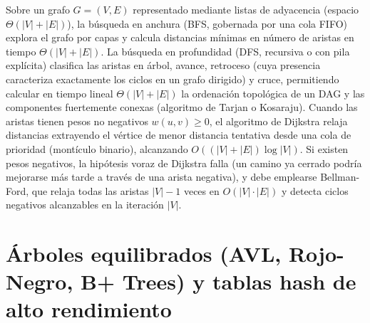 \documentclass{book}
\begin{document}
Sobre un grafo \(G = (V, E)\) representado mediante listas de adyacencia (espacio \(\Theta(|V| + |E|)\)), la búsqueda en anchura (BFS, gobernada por una cola FIFO) explora el grafo por capas y calcula distancias mínimas en número de aristas en tiempo \(\Theta(|V| + |E|)\). La búsqueda en profundidad (DFS, recursiva o con pila explícita) clasifica las aristas en árbol, avance, retroceso (cuya presencia caracteriza exactamente los ciclos en un grafo dirigido) y cruce, permitiendo calcular en tiempo lineal \(\Theta(|V| + |E|)\) la ordenación topológica de un DAG y las componentes fuertemente conexas (algoritmo de Tarjan o Kosaraju).
Cuando las aristas tienen pesos no negativos \(w(u, v) \ge 0\), el algoritmo de Dijkstra relaja distancias extrayendo el vértice de menor distancia tentativa desde una cola de prioridad (montículo binario), alcanzando \(O((|V| + |E|) \log |V|)\). Si existen pesos negativos, la hipótesis voraz de Dijkstra falla (un camino ya cerrado podría mejorarse más tarde a través de una arista negativa), y debe emplearse Bellman-Ford, que relaja todas las aristas \(|V| - 1\) veces en \(O(|V| \cdot |E|)\) y detecta ciclos negativos alcanzables en la iteración \(|V|\).

\section{Árboles equilibrados (AVL, Rojo-Negro, B+ Trees) y tablas hash de alto rendimiento}
\end{document}
